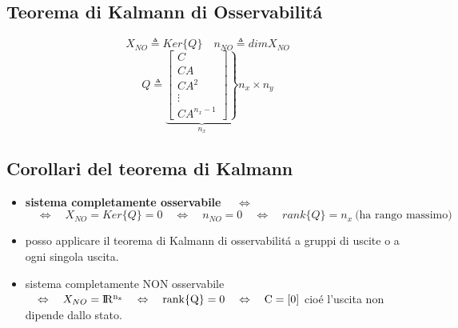 \documentclass[../main.tex]{subfiles}
\begin{document}
	\subsection{Teorema di Kalmann di Osservabilit\'a}
		\[
			X_{NO} \triangleq Ker\{Q\} \quad n_{NO} \triangleq dim { X_{NO} }
		\]
		\[
			Q \triangleq
			\underbrace{
				\left. 
				\begin{bmatrix}
					C\\
					CA\\
					CA^2\\
					\vdots\\
					CA^{n_x-1}
				\end{bmatrix}
			\right\rbrace 
			}_{n_x}
			n_x \times n_y
		\]
	\subsection{Corollari del teorema di Kalmann}
		\begin{itemize}
			\item
				\textbf{sistema completamente osservabile} $ \quad\Leftrightarrow\quad $
				\[
					\quad\Leftrightarrow\quad X_{NO} = Ker\{Q\} = {0} \quad\Leftrightarrow\quad n_{NO} = 0 \quad\Leftrightarrow\quad rank\{Q\} = n_x\ \text{(ha rango massimo)}
				\]
			\item 
				posso applicare il teorema di Kalmann di osservabilit\'a a gruppi di uscite o a ogni singola uscita.
			\item 
				sistema completamente NON osservabile $ \quad\Leftrightarrow\quad X_{NO} = \rm I\!R^{n_x} \quad\Leftrightarrow\quad rank\{Q\} = 0 \quad\Leftrightarrow\quad C = [0] $ cio\'e l'uscita non dipende dallo stato.
		\end{itemize}
	
\end{document}
